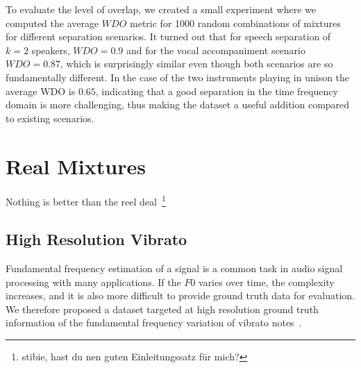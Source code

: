 To evaluate the level of overlap, we created a small experiment where we computed the average \(WDO\) metric for 1000 random combinations of mixtures for different separation scenarios.
It turned out that for speech separation of \(k=2\) speakers, \(WDO=0.9\) and for the vocal accompaniment scenario \(WDO=0.87\), which is surprisingly similar even though both scenarios are so fundamentally different.
In the case of the two instruments playing in unison the average WDO is \(0.65\), indicating that a good separation in the time frequency domain is more challenging, thus making the dataset a useful addition compared to existing scenarios.


\section{Real Mixtures}

Nothing is better than the reel deal~\footnote{stibie, hast du nen guten Einleitungssatz für mich?}

\subsection{High Resolution Vibrato}


Fundamental frequency estimation of a signal is a common task in audio signal processing with many applications. 
If the $F0$ varies over time, the complexity increases, and it is also more difficult to provide ground truth data for evaluation.
We therefore proposed a dataset targeted at high resolution ground truth information of the fundamental frequency variation of vibrato notes~\cite{stoeter15acm}.

